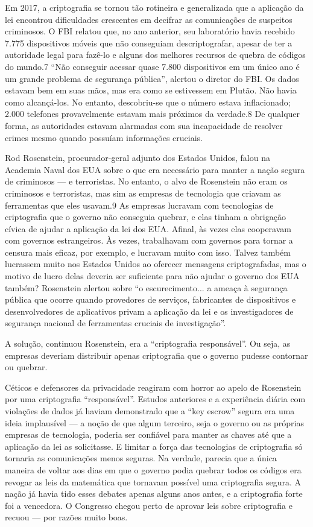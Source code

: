 \documentclass{book}
\begin{document}
Em 2017, a criptografia se tornou tão rotineira e generalizada que a aplicação da lei encontrou dificuldades crescentes em decifrar as comunicações de suspeitos criminosos. O FBI relatou que, no ano anterior, seu laboratório havia recebido 7.775 dispositivos móveis que não conseguiam descriptografar, apesar de ter a autoridade legal para fazê-lo e alguns dos melhores recursos de quebra de códigos do mundo.7 ``Não conseguir acessar quase 7.800 dispositivos em um único ano é um grande problema de segurança pública'', alertou o diretor do FBI. Os dados estavam bem em suas mãos, mas era como se estivessem em Plutão. Não havia como alcançá-los. No entanto, descobriu-se que o número estava inflacionado; 2.000 telefones provavelmente estavam mais próximos da verdade.8 De qualquer forma, as autoridades estavam alarmadas com sua incapacidade de resolver crimes mesmo quando possuíam informações cruciais.

Rod Rosenstein, procurador-geral adjunto dos Estados Unidos, falou na Academia Naval dos EUA sobre o que era necessário para manter a nação segura de criminosos --- e terroristas. No entanto, o alvo de Rosenstein não eram os criminosos e terroristas, mas sim as empresas de tecnologia que criavam as ferramentas que eles usavam.9 As empresas lucravam com tecnologias de criptografia que o governo não conseguia quebrar, e elas tinham a obrigação cívica de ajudar a aplicação da lei dos EUA. Afinal, às vezes elas cooperavam com governos estrangeiros. Às vezes, trabalhavam com governos para tornar a censura mais eficaz, por exemplo, e lucravam muito com isso. Talvez também lucrassem muito nos Estados Unidos ao oferecer mensagens criptografadas, mas o motivo de lucro delas deveria ser suficiente para não ajudar o governo dos EUA também? Rosenstein alertou sobre ``o escurecimento... a ameaça à segurança pública que ocorre quando provedores de serviços, fabricantes de dispositivos e desenvolvedores de aplicativos privam a aplicação da lei e os investigadores de segurança nacional de ferramentas cruciais de investigação''.

A solução, continuou Rosenstein, era a ``criptografia responsável''. Ou seja, as empresas deveriam distribuir apenas criptografia que o governo pudesse contornar ou quebrar.

Céticos e defensores da privacidade reagiram com horror ao apelo de Rosenstein por uma criptografia ``responsável''. Estudos anteriores e a experiência diária com violações de dados já haviam demonstrado que a ``key escrow'' segura era uma ideia implausível --- a noção de que algum terceiro, seja o governo ou as próprias empresas de tecnologia, poderia ser confiável para manter as chaves até que a aplicação da lei as solicitasse. E limitar a força das tecnologias de criptografia só tornaria as comunicações menos seguras. Na verdade, parecia que a única maneira de voltar aos dias em que o governo podia quebrar todos os códigos era revogar as leis da matemática que tornavam possível uma criptografia segura. A nação já havia tido esses debates apenas alguns anos antes, e a criptografia forte foi a vencedora. O Congresso chegou perto de aprovar leis sobre criptografia e recuou --- por razões muito boas.
\end{document}
